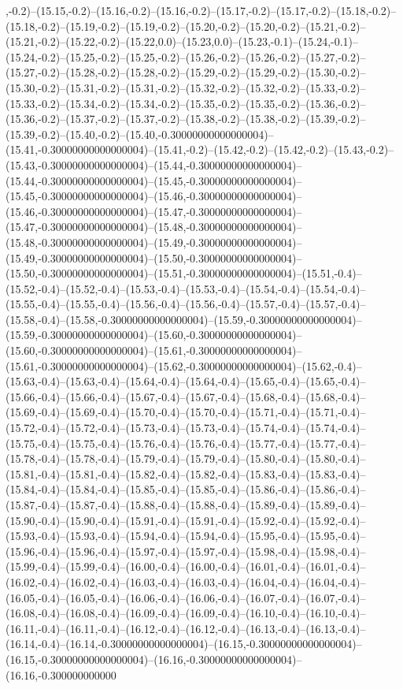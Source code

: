 ,-0.2)--(15.15,-0.2)--(15.16,-0.2)--(15.16,-0.2)--(15.17,-0.2)--(15.17,-0.2)--(15.18,-0.2)--(15.18,-0.2)--(15.19,-0.2)--(15.19,-0.2)--(15.20,-0.2)--(15.20,-0.2)--(15.21,-0.2)--(15.21,-0.2)--(15.22,-0.2)--(15.22,0.0)--(15.23,0.0)--(15.23,-0.1)--(15.24,-0.1)--(15.24,-0.2)--(15.25,-0.2)--(15.25,-0.2)--(15.26,-0.2)--(15.26,-0.2)--(15.27,-0.2)--(15.27,-0.2)--(15.28,-0.2)--(15.28,-0.2)--(15.29,-0.2)--(15.29,-0.2)--(15.30,-0.2)--(15.30,-0.2)--(15.31,-0.2)--(15.31,-0.2)--(15.32,-0.2)--(15.32,-0.2)--(15.33,-0.2)--(15.33,-0.2)--(15.34,-0.2)--(15.34,-0.2)--(15.35,-0.2)--(15.35,-0.2)--(15.36,-0.2)--(15.36,-0.2)--(15.37,-0.2)--(15.37,-0.2)--(15.38,-0.2)--(15.38,-0.2)--(15.39,-0.2)--(15.39,-0.2)--(15.40,-0.2)--(15.40,-0.30000000000000004)--(15.41,-0.30000000000000004)--(15.41,-0.2)--(15.42,-0.2)--(15.42,-0.2)--(15.43,-0.2)--(15.43,-0.30000000000000004)--(15.44,-0.30000000000000004)--(15.44,-0.30000000000000004)--(15.45,-0.30000000000000004)--(15.45,-0.30000000000000004)--(15.46,-0.30000000000000004)--(15.46,-0.30000000000000004)--(15.47,-0.30000000000000004)--(15.47,-0.30000000000000004)--(15.48,-0.30000000000000004)--(15.48,-0.30000000000000004)--(15.49,-0.30000000000000004)--(15.49,-0.30000000000000004)--(15.50,-0.30000000000000004)--(15.50,-0.30000000000000004)--(15.51,-0.30000000000000004)--(15.51,-0.4)--(15.52,-0.4)--(15.52,-0.4)--(15.53,-0.4)--(15.53,-0.4)--(15.54,-0.4)--(15.54,-0.4)--(15.55,-0.4)--(15.55,-0.4)--(15.56,-0.4)--(15.56,-0.4)--(15.57,-0.4)--(15.57,-0.4)--(15.58,-0.4)--(15.58,-0.30000000000000004)--(15.59,-0.30000000000000004)--(15.59,-0.30000000000000004)--(15.60,-0.30000000000000004)--(15.60,-0.30000000000000004)--(15.61,-0.30000000000000004)--(15.61,-0.30000000000000004)--(15.62,-0.30000000000000004)--(15.62,-0.4)--(15.63,-0.4)--(15.63,-0.4)--(15.64,-0.4)--(15.64,-0.4)--(15.65,-0.4)--(15.65,-0.4)--(15.66,-0.4)--(15.66,-0.4)--(15.67,-0.4)--(15.67,-0.4)--(15.68,-0.4)--(15.68,-0.4)--(15.69,-0.4)--(15.69,-0.4)--(15.70,-0.4)--(15.70,-0.4)--(15.71,-0.4)--(15.71,-0.4)--(15.72,-0.4)--(15.72,-0.4)--(15.73,-0.4)--(15.73,-0.4)--(15.74,-0.4)--(15.74,-0.4)--(15.75,-0.4)--(15.75,-0.4)--(15.76,-0.4)--(15.76,-0.4)--(15.77,-0.4)--(15.77,-0.4)--(15.78,-0.4)--(15.78,-0.4)--(15.79,-0.4)--(15.79,-0.4)--(15.80,-0.4)--(15.80,-0.4)--(15.81,-0.4)--(15.81,-0.4)--(15.82,-0.4)--(15.82,-0.4)--(15.83,-0.4)--(15.83,-0.4)--(15.84,-0.4)--(15.84,-0.4)--(15.85,-0.4)--(15.85,-0.4)--(15.86,-0.4)--(15.86,-0.4)--(15.87,-0.4)--(15.87,-0.4)--(15.88,-0.4)--(15.88,-0.4)--(15.89,-0.4)--(15.89,-0.4)--(15.90,-0.4)--(15.90,-0.4)--(15.91,-0.4)--(15.91,-0.4)--(15.92,-0.4)--(15.92,-0.4)--(15.93,-0.4)--(15.93,-0.4)--(15.94,-0.4)--(15.94,-0.4)--(15.95,-0.4)--(15.95,-0.4)--(15.96,-0.4)--(15.96,-0.4)--(15.97,-0.4)--(15.97,-0.4)--(15.98,-0.4)--(15.98,-0.4)--(15.99,-0.4)--(15.99,-0.4)--(16.00,-0.4)--(16.00,-0.4)--(16.01,-0.4)--(16.01,-0.4)--(16.02,-0.4)--(16.02,-0.4)--(16.03,-0.4)--(16.03,-0.4)--(16.04,-0.4)--(16.04,-0.4)--(16.05,-0.4)--(16.05,-0.4)--(16.06,-0.4)--(16.06,-0.4)--(16.07,-0.4)--(16.07,-0.4)--(16.08,-0.4)--(16.08,-0.4)--(16.09,-0.4)--(16.09,-0.4)--(16.10,-0.4)--(16.10,-0.4)--(16.11,-0.4)--(16.11,-0.4)--(16.12,-0.4)--(16.12,-0.4)--(16.13,-0.4)--(16.13,-0.4)--(16.14,-0.4)--(16.14,-0.30000000000000004)--(16.15,-0.30000000000000004)--(16.15,-0.30000000000000004)--(16.16,-0.30000000000000004)--(16.16,-0.300000000000